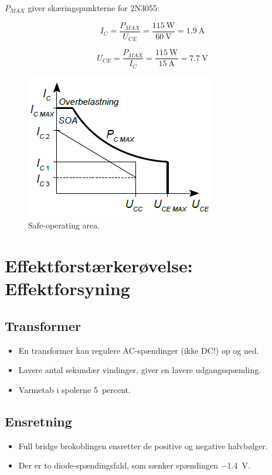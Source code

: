 \documentclass[danish]{article}
\begin{document}
$P_{MAX}$ giver skæringspunkterne for 2N3055:

\begin{equation}
I_C = \dfrac{P_{MAX}}{U_{CE}} = \dfrac{\SI{115}{\watt}}{\SI{60}{\volt}} = \SI{1.9}{\ampere}
\end{equation}

\begin{equation}
U_{CE} = \dfrac{P_{MAX}}{I_C} = \dfrac{\SI{115}{\watt}}{\SI{15}{\ampere}} = \SI{7.7}{\volt}
\end{equation}

\begin{figure} [H]
	\centering
	\includegraphics[width=0.5\linewidth]{graphics/soa}
	\caption{Safe-operating area.}
	\label{fig:soa}
\end{figure}

\newpage
\section{Effektforstærkerøvelse: Effektforsyning}

\subsection{Transformer}
\begin{itemize}
	\item En transformer kan regulere AC-spændinger (ikke DC!) op og ned.
	\item Lavere antal sekundær vindinger, giver en lavere udgangsspænding.
	\item Varmetab i spolerne \approx \SI{5}{percent}.
\end{itemize}


\subsection{Ensretning}
\begin{itemize}
	\item Full bridge brokoblingen ensretter de positive og negative halvbølger.
	\item Der er to diode-spændingsfald, som sænker spændingen \approx \SI{-1.4}{\volt}.
\end{itemize}
\end{document}
